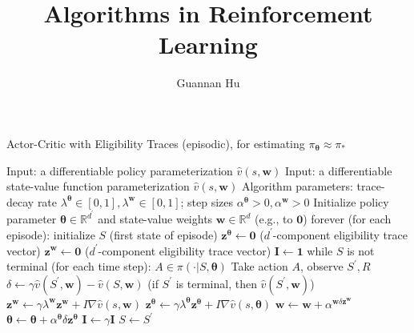 \documentclass[12pt,a4paper]{article}
\begin{document}
\title{Algorithms in Reinforcement Learning}
\author{Guannan Hu}
\maketitle

\begin{algorithm}
\caption{Actor-Critic with Eligibility Traces (episodic), for estimating $\pi_{\bm{\theta}} \approx \pi_{*}$}
\begin{algorithmic}
	\State Input: a differentiable policy parameterization $\hat{v}(s, \mathbf{w})$
	\State Input: a differentiable state-value function parameterization $\hat{v}(s, \mathbf{w})$
	\State Algorithm parameters: trace-decay rate $\lambda^{\bm{\theta}} \in [0, 1], \lambda^{\mathbf{w}} \in [0,1]$; step sizes $\alpha^{\bm{\theta}}>0, \alpha^{\mathbf{w}} > 0$
	\State Initialize policy parameter $\bm{\theta} \in \mathbb{R}^{d^{'}}$ and state-value weights $\mathbf{w} \in \mathbb{R}^{d}$ (e.g., to $\mathbf{0}$)
	\State	
	\Loop \quad forever (for each episode):
		\State initialize $S$ (first state of episode)
		\State $\mathbf{z}^{\bm{\theta}} \leftarrow \mathbf{0}$ ($d^{'}$-component eligibility trace vector)
		\State $\mathbf{z}^{\mathbf{w}} \leftarrow \mathbf{0}$ ($d^{'}$-component eligibility trace vector)
		\State $\mathbf{I} \leftarrow \mathbf{1}$
		\Loop \quad while $S$ is not terminal (for each time step):
			\State $A \in \pi(\cdot|S, \bm{\theta})$
			\State Take action $A$, observe $S^{'}, R$
			\State $\delta \leftarrow \gamma\hat{v}(S^{'}, \mathbf{w}) - \hat{v}(S, \mathbf{w})$  \qquad  (if $S^{'}$ is terminal, then $\hat{v}(S^{'}, \mathbf{w})$)
			\State $\mathbf{z}^{\mathbf{w}} \leftarrow \gamma\lambda^{\mathbf{w}}\mathbf{z}^{\mathbf{w}} + I\nabla\hat{v}(s, \mathbf{w})$
			\State $\mathbf{z}^{\bm{\theta}} \leftarrow \gamma\lambda^{\bm{\theta}}\mathbf{z}^{\bm{\theta}} + I\nabla\hat{v}(s, \bm{\theta})$
			\State $\mathbf{w} \leftarrow \mathbf{w} + \alpha^{\mathbf{w}\delta\mathbf{z}^{\mathbf{w}}}$
			\State $\bm{\theta} \leftarrow \bm{\theta} + \alpha^{\mathbf{\theta}}\delta\mathbf{z}^{\bm{\theta}}$
			\State $\mathbf{I} \leftarrow \gamma \mathbf{I}$
			\State $S \leftarrow S^{'}$
		\EndLoop
	\EndLoop
\end{algorithmic}
\end{algorithm}
\end{document}
